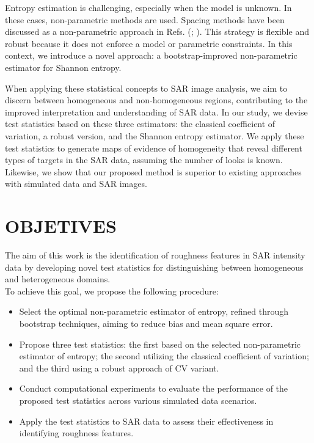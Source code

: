 \documentclass[
  letterpaper,
  11pt,
  english,
  doublespacing,
  headsepline,
  consistentlayout,
  oneside,
  openany]{MastersDoctoralThesis}
\providecommand{\tightlist}{%
  \setlength{\itemsep}{0pt}\setlength{\parskip}{0pt}}\usepackage{longtable,booktabs,array}
\begin{document}
Entropy estimation is challenging, especially when the model is unknown.
In these cases, non-parametric methods are used. Spacing methods have
been discussed as a non-parametric approach in Refs.
(;
). This strategy
is flexible and robust because it does not enforce a model or parametric
constraints. In this context, we introduce a novel approach: a
bootstrap-improved non-parametric estimator for Shannon entropy.

When applying these statistical concepts to SAR image analysis, we aim
to discern between homogeneous and non-homogeneous regions, contributing
to the improved interpretation and understanding of SAR data. In our
study, we devise test statistics based on these three estimators: the
classical coefficient of variation, a robust version, and the Shannon
entropy estimator. We apply these test statistics to generate maps of
evidence of homogeneity that reveal different types of targets in the
SAR data, assuming the number of looks is known. Likewise, we show that
our proposed method is superior to existing approaches with simulated
data and SAR images.

\section{OBJETIVES}\label{objetives}

The aim of this work is the identification of roughness features in SAR
intensity data by developing novel test statistics for distinguishing
between homogeneous and heterogeneous domains.\\
To achieve this goal, we propose the following procedure:

\begin{itemize}
\tightlist
\item
  Select the optimal non-parametric estimator of entropy, refined
  through bootstrap techniques, aiming to reduce bias and mean square
  error.
\item
  Propose three test statistics: the first based on the selected
  non-parametric estimator of entropy; the second utilizing the
  classical coefficient of variation; and the third using a robust
  approach of CV variant.
\item
  Conduct computational experiments to evaluate the performance of the
  proposed test statistics across various simulated data scenarios.
\item
  Apply the test statistics to SAR data to assess their effectiveness in
  identifying roughness features.
\end{itemize}
\end{document}
